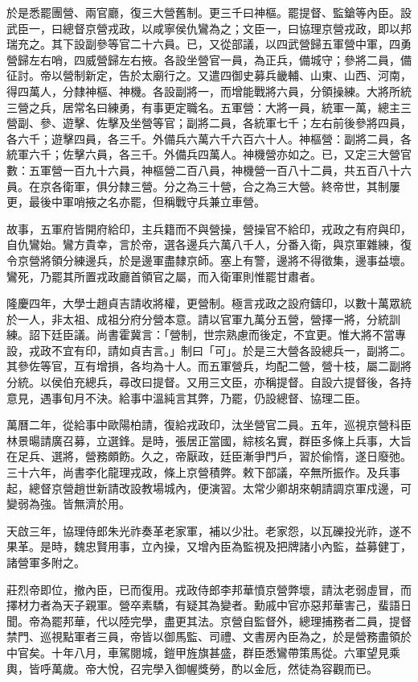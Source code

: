 於是悉罷團營、兩官廳，復三大營舊制。更三千曰神樞。罷提督、監鎗等內臣。設武臣一，曰總督京營戎政，以咸寧侯仇鸞為之；文臣一，曰協理京營戎政，即以邦瑞充之。其下設副參等官二十六員。已，又從部議，以四武營歸五軍營中軍，四勇營歸左右哨，四威營歸左右掖。各設坐營官一員，為正兵，備城守；參將二員，備征討。帝以營制新定，告於太廟行之。又遣四御史募兵畿輔、山東、山西、河南，得四萬人，分隸神樞、神機。各設副將一，而增能戰將六員，分領操練。大將所統三營之兵，居常名曰練勇，有事更定職名。五軍營：大將一員，統軍一萬，總主三營副、參、遊擊、佐擊及坐營等官；副將二員，各統軍七千；左右前後參將四員，各六千；遊擊四員，各三千。外備兵六萬六千六百六十人。神樞營：副將二員，各統軍六千；佐擊六員，各三千。外備兵四萬人。神機營亦如之。已，又定三大營官數：五軍營一百九十六員，神樞營二百八員，神機營一百八十二員，共五百八十六員。在京各衛軍，俱分隸三營。分之為三十營，合之為三大營。終帝世，其制屢更，最後中軍哨掖之名亦罷，但稱戰守兵兼立車營。

故事，五軍府皆開府給印，主兵籍而不與營操，營操官不給印，戎政之有府與印，自仇鸞始。鸞方貴幸，言於帝，選各邊兵六萬八千人，分番入衛，與京軍雜練，復令京營將領分練邊兵，於是邊軍盡隸京師。塞上有警，邊將不得徵集，邊事益壞。鸞死，乃罷其所置戎政廳首領官之屬，而入衛軍則惟罷甘肅者。

隆慶四年，大學士趙貞吉請收將權，更營制。極言戎政之設府鑄印，以數十萬眾統於一人，非太祖、成祖分府分營本意。請以官軍九萬分五營，營擇一將，分統訓練。詔下廷臣議。尚書霍冀言：「營制，世宗熟慮而後定，不宜更。惟大將不當專設，戎政不宜有印，請如貞吉言。」制曰「可」。於是三大營各設總兵一，副將二。其參佐等官，互有增損，各均為十人。而五軍營兵，均配二營，營十枝，屬二副將分統。以侯伯充總兵，尋改曰提督。又用三文臣，亦稱提督。自設六提督後，各持意見，遇事旬月不決。給事中溫純言其弊，乃罷，仍設總督、協理二臣。

萬曆二年，從給事中歐陽柏請，復給戎政印，汰坐營官二員。五年，巡視京營科臣林景暘請廣召募，立選鋒。是時，張居正當國，綜核名實，群臣多條上兵事，大旨在足兵、選將，營務頗飭。久之，帝厭政，廷臣漸爭門戶，習於偷惰，遂日廢弛。三十六年，尚書李化龍理戎政，條上京營積弊。敕下部議，卒無所振作。及兵事起，總督京營趙世新請改設教場城內，便演習。太常少卿胡來朝請調京軍戍邊，可變弱為強。皆無濟於用。

天啟三年，協理侍郎朱光祚奏革老家軍，補以少壯。老家怨，以瓦礫投光祚，遂不果革。是時，魏忠賢用事，立內操，又增內臣為監視及把牌諸小內監，益募健丁，諸營軍多附之。

莊烈帝即位，撤內臣，已而復用。戎政侍郎李邦華憤京營弊壞，請汰老弱虛冒，而擇材力者為天子親軍。營卒素驕，有疑其為變者。勳戚中官亦惡邦華害己，蜚語日聞。帝為罷邦華，代以陸完學，盡更其法。京營自監督外，總理捕務者二員，提督禁門、巡視點軍者三員，帝皆以御馬監、司禮、文書房內臣為之，於是營務盡領於中官矣。十年八月，車駕閱城，鎧甲旌旗甚盛，群臣悉鸞帶策馬從。六軍望見乘輿，皆呼萬歲。帝大悅，召完學入御幄獎勞，酌以金卮，然徒為容觀而已。

